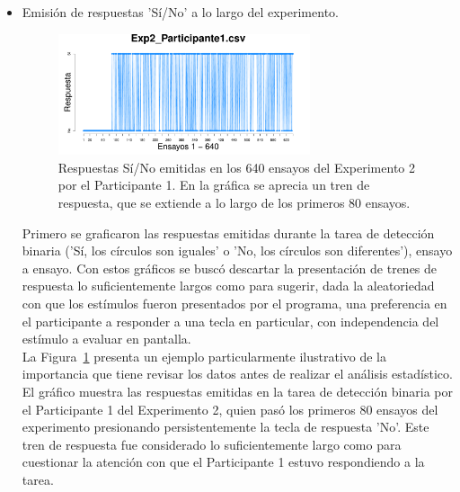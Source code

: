 \begin{itemize}
	\item Emisión de respuestas 'Sí/No' a lo largo del experimento.

\begin{figure}[h]
\centering
\includegraphics[width=0.7\textwidth]{Figures/Response_Exp2_P1} 
\decoRule
\caption[Explorando datos individuales (ejemplo): Respuesta emitida por cada ensayo a la tarea binaria]{Respuestas Sí/No emitidas en los 640 ensayos del Experimento 2 por el Participante 1. En la gráfica se aprecia un tren de respuesta, que se extiende a lo largo de los primeros 80 ensayos.}
\label{fig:Resp_E2_P1}
\end{figure}

Primero se graficaron las respuestas emitidas durante la tarea de detección binaria ('Sí, los círculos son iguales' o 'No, los círculos son diferentes'), ensayo a ensayo. Con estos gráficos se buscó descartar la presentación de trenes de respuesta lo suficientemente largos como para sugerir, dada la aleatoriedad con que los estímulos fueron presentados por el programa, una preferencia en el participante a responder a una tecla en particular, con independencia del estímulo a evaluar en pantalla.\\

La Figura~\ref{fig:Resp_E2_P1} presenta un ejemplo particularmente ilustrativo de la importancia que tiene revisar los datos antes de realizar el análisis estadístico. El gráfico muestra las respuestas emitidas en la tarea de detección binaria por el Participante 1 del Experimento 2, quien pasó los primeros 80 ensayos del experimento presionando persistentemente la tecla de respuesta 'No'. Este tren de respuesta fue considerado lo suficientemente largo como para cuestionar la atención con que el Participante 1 estuvo respondiendo a la tarea.\\ 



\end{itemize}
